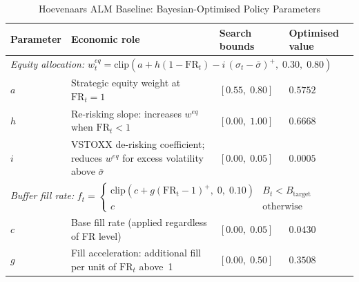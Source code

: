 \begin{table}[H]
\centering
\caption{Hoevenaars ALM Baseline: Bayesian-Optimised Policy Parameters}
\label{tab:hoevenaars_params}
\begin{threeparttable}
\small
\setlength{\tabcolsep}{5pt}
\renewcommand{\arraystretch}{1.20}
\begin{tabular}{l
    >{\raggedright\arraybackslash}p{5.2cm}
    >{\centering\arraybackslash}p{2.0cm}
    >{\centering\arraybackslash}p{2.0cm}}
\toprule
\textbf{Parameter}
  & \textbf{Economic role}
  & \textbf{Search bounds}
  & \textbf{Optimised value} \\
\midrule

\multicolumn{4}{l}{%
  \textit{Equity allocation:\quad}
  $w^{eq}_t = \mathrm{clip}\!\left(
      a + h(1 - \mathrm{FR}_t) - i\,(\sigma_t - \bar{\sigma})^{+},\;
      0.30,\;0.80\right)$} \\[3pt]

$a$
  & Strategic equity weight at $\mathrm{FR}_t = 1$
  & $[0.55,\;0.80]$
  & $0.5752$ \\

$h$
  & Re-risking slope: increases $w^{eq}$ when $\mathrm{FR}_t < 1$
  & $[0.00,\;1.00]$
  & $0.6668$ \\

$i$
  & VSTOXX de-risking coefficient; reduces $w^{eq}$ for excess volatility above $\bar{\sigma}$\tnote{a}
  & $[0.00,\;0.05]$
  & $0.0005$ \\[6pt]

\multicolumn{4}{l}{%
  \textit{Buffer fill rate:\quad}
  $f_t =
    \begin{cases}
      \mathrm{clip}(c + g(\mathrm{FR}_t - 1)^{+},\;0,\;0.10) & B_t < B_{\mathrm{target}} \\
      c & \text{otherwise}
    \end{cases}$} \\[3pt]

$c$
  & Base fill rate (applied regardless of FR level)
  & $[0.00,\;0.05]$
  & $0.0430$ \\

$g$
  & Fill acceleration: additional fill per unit of $\mathrm{FR}_t$ above~1
  & $[0.00,\;0.50]$
  & $0.3508$ \\


\end{tabular}
\end{threeparttable}
\end{table}
